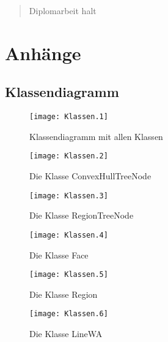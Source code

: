 




\begin{abstract}
Diplomarbeit halt
\end{abstract}
\dominitoc[e]
\doparttoc

\tableofcontents 





\begin{appendix} \label{anhang}
\part*{Anhänge}
\adjustptc[-2]
\parttoc

   
 
 \chapter{Klassendiagramm}
 \begin{landscape}
 \begin{figure}	
	\texttt{[image: Klassen.1]}
	\caption{Klassendiagramm mit allen Klassen}
	\label{fig:UML_Klassendiagramm}
\end{figure}

 \begin{figure}	
	\texttt{[image: Klassen.2]}
	\caption{Die Klasse ConvexHullTreeNode}
	\label{fig:UML_CHTN}
\end{figure}

 \begin{figure}	
	\texttt{[image: Klassen.3]}
	\caption{Die Klasse RegionTreeNode}
	\label{fig:UML_RTN}
\end{figure}

 \begin{figure}	
	\texttt{[image: Klassen.4]}
	\caption{Die Klasse Face}
	\label{fig:UML_Face}
\end{figure}

 \begin{figure}	
	\texttt{[image: Klassen.5]}
	\caption{Die Klasse Region}
	\label{fig:UML_Region}
\end{figure}

 \begin{figure}	
	\texttt{[image: Klassen.6]}
	\caption{Die Klasse LineWA}
	\label{fig:UML_LineWA}
\end{figure}


\end{landscape}
\end{appendix}
